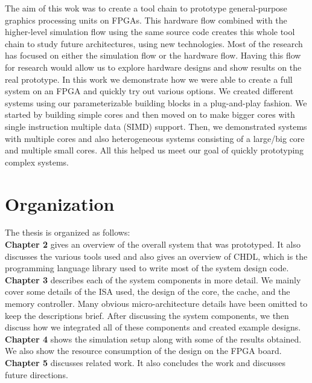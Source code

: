 The aim of this wok was to create a tool chain to prototype general-purpose graphics processing units on FPGAs. This hardware flow combined with the higher-level simulation flow using the same source code creates this whole tool chain to study future architectures, using new technologies. Most of the  research has focused on either the simulation flow or the hardware flow. Having this flow for research would allow us to explore hardware designs and show results on the real prototype. %
In this work we demonstrate how we were able to create a full system on an FPGA and quickly try out various options. We created different systems using our parameterizable building blocks in a plug-and-play fashion. We started by building simple cores and then moved on to make bigger cores with single instruction multiple data (SIMD) support. Then, we demonstrated systems with multiple cores and also heterogeneous systems consisting of a large/big core and multiple small cores. All this helped us meet our goal of quickly prototyping complex systems.

\section{Organization}
The thesis is organized as follows:
\\ 
\noindent\textbf{Chapter 2} gives an overview of the overall system that was prototyped. It also discusses the various tools used and also gives an overview of CHDL, which is the programming language library used to write most of the system design code.
\\
\noindent\textbf{Chapter 3} describes each of the system components in more detail. We mainly cover some details of the ISA used, the design of the core, the cache, and the memory controller. Many obvious micro-architecture details have been omitted to keep the descriptions brief. After discussing the system components, we then discuss how we integrated all of these components and created example designs.
\\
\noindent\textbf{Chapter 4} shows the simulation setup along with some of the results obtained. We also show the resource consumption of the design on the FPGA board.
\\
\noindent\textbf{Chapter 5} discusses related work. It also concludes the work and discusses future directions. 

